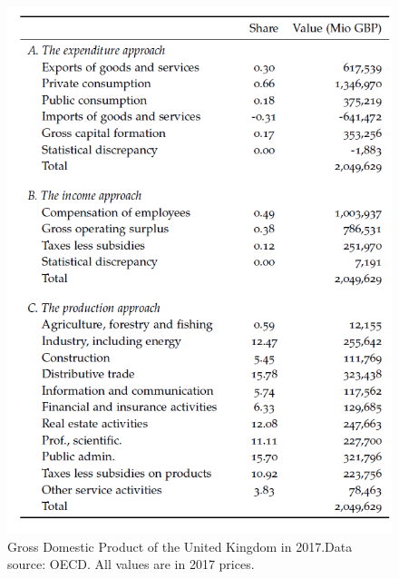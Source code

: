 \documentclass[]{book}
\begin{document}
\begin{figure}

{\centering \includegraphics[width=0.8\linewidth]{_resources/chapter_gdp/tab1} 

}

\caption{Gross Domestic Product of the United Kingdom in 2017.Data source: OECD. All values are in 2017 prices.}\label{fig:gdp12}
\end{figure}
\end{document}
